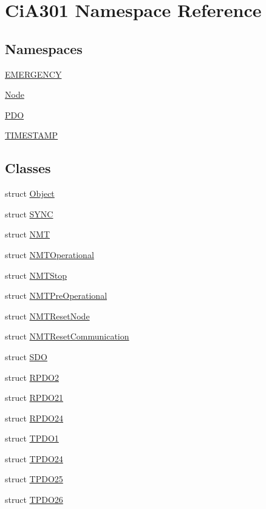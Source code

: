 \hypertarget{namespace_ci_a301}{\section{Ci\-A301 Namespace Reference}
\label{namespace_ci_a301}
}
\subsection*{Namespaces}
\begin{DoxyCompactItemize}
\item 
\hyperlink{namespace_ci_a301_1_1_e_m_e_r_g_e_n_c_y}{E\-M\-E\-R\-G\-E\-N\-C\-Y}
\item 
\hyperlink{namespace_ci_a301_1_1_node}{Node}
\item 
\hyperlink{namespace_ci_a301_1_1_p_d_o}{P\-D\-O}
\item 
\hyperlink{namespace_ci_a301_1_1_t_i_m_e_s_t_a_m_p}{T\-I\-M\-E\-S\-T\-A\-M\-P}
\end{DoxyCompactItemize}
\subsection*{Classes}
\begin{DoxyCompactItemize}
\item 
struct \hyperlink{struct_ci_a301_1_1_object}{Object}
\item 
struct \hyperlink{struct_ci_a301_1_1_s_y_n_c}{S\-Y\-N\-C}
\item 
struct \hyperlink{struct_ci_a301_1_1_n_m_t}{N\-M\-T}
\item 
struct \hyperlink{struct_ci_a301_1_1_n_m_t_operational}{N\-M\-T\-Operational}
\item 
struct \hyperlink{struct_ci_a301_1_1_n_m_t_stop}{N\-M\-T\-Stop}
\item 
struct \hyperlink{struct_ci_a301_1_1_n_m_t_pre_operational}{N\-M\-T\-Pre\-Operational}
\item 
struct \hyperlink{struct_ci_a301_1_1_n_m_t_reset_node}{N\-M\-T\-Reset\-Node}
\item 
struct \hyperlink{struct_ci_a301_1_1_n_m_t_reset_communication}{N\-M\-T\-Reset\-Communication}
\item 
struct \hyperlink{struct_ci_a301_1_1_s_d_o}{S\-D\-O}
\item 
struct \hyperlink{struct_ci_a301_1_1_r_p_d_o2}{R\-P\-D\-O2}
\item 
struct \hyperlink{struct_ci_a301_1_1_r_p_d_o21}{R\-P\-D\-O21}
\item 
struct \hyperlink{struct_ci_a301_1_1_r_p_d_o24}{R\-P\-D\-O24}
\item 
struct \hyperlink{struct_ci_a301_1_1_t_p_d_o1}{T\-P\-D\-O1}
\item 
struct \hyperlink{struct_ci_a301_1_1_t_p_d_o24}{T\-P\-D\-O24}
\item 
struct \hyperlink{struct_ci_a301_1_1_t_p_d_o25}{T\-P\-D\-O25}
\item 
struct \hyperlink{struct_ci_a301_1_1_t_p_d_o26}{T\-P\-D\-O26}
\end{DoxyCompactItemize}
